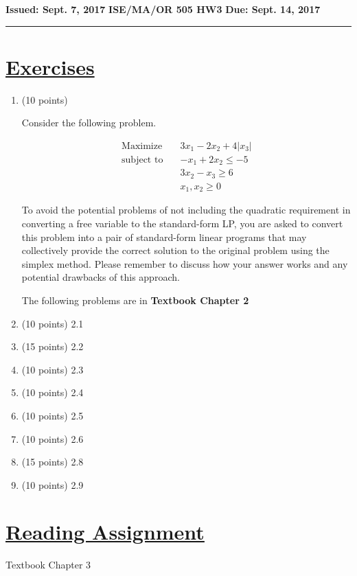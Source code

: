 \documentclass[12pt]{article}
\begin{document}
 
 

\textbf{Issued: Sept. 7, 2017 } \qquad 
\textbf{ISE/MA/OR 505 HW3} \qquad 
\textbf{Due: Sept. 14, 2017}
\vspace{3mm}
\hrule


\section*{\underline{Exercises}}

\begin{enumerate}
\item  
(10 points)

Consider the following problem. 

\begin{equation*}
\begin{aligned}
\text{Maximize} \quad & 3x_1 -2x_2 + 4|x_3| \\
\text{subject\  to} \quad & -x_1 + 2x_2 \leqslant -5 \\
& 3x_2 - x_3 \geqslant 6 \\
& x_1, x_2 \geqslant 0
\end{aligned}
\end{equation*}

To avoid the potential problems of not including the quadratic requirement in converting a free variable to the standard-form LP, you are asked to convert this problem into a pair of standard-form linear programs that may collectively provide the correct solution to the original problem using the simplex method. Please remember to discuss how your answer works and any potential drawbacks of this approach. 


\vspace{5mm}

The following problems are in \textbf{Textbook Chapter 2}

\item (10 points) 2.1
\item (15 points) 2.2
\item (10 points) 2.3
\item (10 points) 2.4
\item (10 points) 2.5
\item (10 points) 2.6
\item (15 points) 2.8
\item (10 points) 2.9

\end{enumerate}

\section*{\underline{Reading Assignment}}

Textbook Chapter 3
\end{document}
